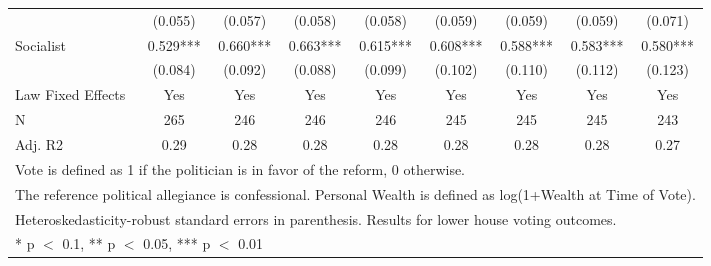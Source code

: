 \begin{table}
\begin{tabular}[t]{lcccccccc}
 & (\num{0.055}) & (\num{0.057}) & (\num{0.058}) & (\num{0.058}) & (\num{0.059}) & (\num{0.059}) & (\num{0.059}) & (\num{0.071})\\
Socialist & \num{0.529}*** & \num{0.660}*** & \num{0.663}*** & \num{0.615}*** & \num{0.608}*** & \num{0.588}*** & \num{0.583}*** & \num{0.580}***\\
 & (\num{0.084}) & (\num{0.092}) & (\num{0.088}) & (\num{0.099}) & (\num{0.102}) & (\num{0.110}) & (\num{0.112}) & (\num{0.123})\\
\midrule
Law Fixed Effects & Yes & Yes & Yes & Yes & Yes & Yes & Yes & Yes\\
N & \num{265} & \num{246} & \num{246} & \num{246} & \num{245} & \num{245} & \num{245} & \num{243}\\
Adj. R2 & \num{0.29} & \num{0.28} & \num{0.28} & \num{0.28} & \num{0.28} & \num{0.28} & \num{0.28} & \num{0.27}\\
\bottomrule
\multicolumn{9}{l}{\rule{0pt}{1em}Vote is defined as 1 if the politician is in favor of the reform, 0 otherwise.}\\
\multicolumn{9}{l}{\rule{0pt}{1em}The reference political allegiance is confessional. Personal Wealth is defined as log(1+Wealth at Time of Vote).}\\
\multicolumn{9}{l}{\rule{0pt}{1em}Heteroskedasticity-robust standard errors in parenthesis. Results for lower house voting outcomes.}\\
\multicolumn{9}{l}{\rule{0pt}{1em}* p $<$ 0.1, ** p $<$ 0.05, *** p $<$ 0.01}\\
\end{tabular}
\end{table}
